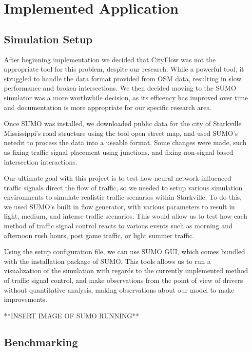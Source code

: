 \documentclass[conference]{IEEEtran}
\begin{document}
\section{Implemented Application}

\subsection{Simulation Setup}

After beginning implementation we decided that CityFlow was not the appropriate tool for this problem, despite our research. While a powerful tool, it struggled to handle the data format provided from OSM data, resulting in slow performance and broken intersections. We then decided moving to the SUMO simulator was a more worthwhile decision, as its efficency has improved over time and documentation is more appropriate for our specific research area. 

Once SUMO was installed, we downloaded public data for the city of Starkville Mississippi's road structure using the tool open street map, and used SUMO's netedit to process the data into a useable format. Some changes were made, such as fixing traffic signal placement using junctions, and fixing non-signal based intersection interactions. 

Our ultimate goal with this project is to test how neural network influenced traffic signals direct the flow of traffic, so we needed to setup various simulation environments to simulate realistic traffic scenarios within Starkville. To do this, we used SUMO's built in flow generator, with various parameters to result in light, medium, and intense traffic scenarios. This would allow us to test how each method of traffic signal control reacts to various events such as morning and afternoon rush hours, post game traffic, or light summer traffic. 

Using the setup configuration file, we can use SUMO GUI, which comes bundled with the installation package of SUMO. This tools allows us to run a visualization of the simulation with regards to the currently implemented method of traffic signal control, and make observations from the point of view of drivers without quantitative analysis, making observations about our model to make improvements. 

**INSERT IMAGE OF SUMO RUNNING**

\subsection{Benchmarking}
\end{document}
